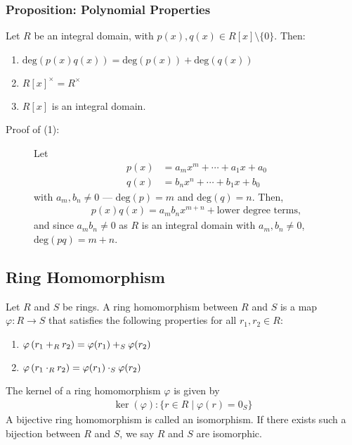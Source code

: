 \documentclass[8pt]{extarticle}
\begin{document}
  \subsubsection{Proposition: Polynomial Properties}%
  Let $R$ be an integral domain, with $p(x),q(x)\in R[x]\setminus\{0\}$. Then:
  \begin{enumerate}[(1)]
    \item $\text{deg}(p(x)q(x)) = \text{deg}(p(x)) + \text{deg}(q(x))$
    \item $R[x]^{\times} = R^{\times}$
    \item $R[x]$ is an integral domain.
  \end{enumerate}
  \begin{description}
    \item[Proof of (1):] Let
      \begin{align*}
        p(x) &= a_mx^m + \cdots + a_1x + a_0\\
        q(x) &= b_nx^n + \cdots + b_1x + b_0
      \end{align*}
      with $a_m,b_n\neq 0$ --- $\text{deg}(p) = m$ and $\text{deg}(q) = n$. Then,
      \begin{align*}
        p(x)q(x) = a_mb_nx^{m+n} + \text{lower degree terms},
      \end{align*}
      and since $a_mb_n\neq 0$ as $R$ is an integral domain with $a_m,b_n\neq 0$, $\text{deg}(pq) = m+n$.
  \end{description}
  \subsection{Ring Homomorphism}%
  Let $R$ and $S$ be rings. A ring homomorphism between $R$ and $S$ is a map $\varphi: R\rightarrow S$ that satisfies the following properties for all $r_1,r_2\in R$:
  \begin{enumerate}[(1)]
    \item $\displaystyle\varphi\left(r_1 +_{\tiny R} r_2\right) = \varphi(r_1) +_{\tiny S} \varphi(r_2)$
    \item $\displaystyle\varphi \left(r_1 \cdot_{\tiny R} r_2\right) = \varphi(r_1) \cdot_{\tiny S} \varphi(r_2)$
  \end{enumerate}
  The kernel of a ring homomorphism $\varphi$ is given by
  \begin{align*}
    \ker(\varphi): \{r\in R\mid \varphi(r) = 0_S\}
  \end{align*}
  A bijective ring homomorphism is called an isomorphism. If there exists such a bijection between $R$ and $S$, we say $R$ and $S$ are isomorphic.\\
\end{document}
